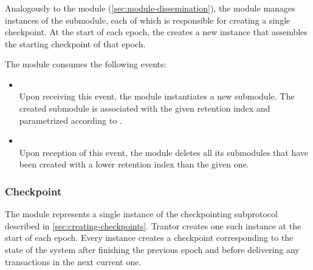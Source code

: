\documentclass{article}
\begin{document}
\subsubsection{}

Analogously to the  module (\cref{sec:module-dissemination}),
the  module manages instances of the  submodule,
each of which is responsible for creating a single checkpoint.
At the start of each epoch, the  creates a new  instance that assembles the starting checkpoint of that epoch.

The  module consumes the following events:

\begin{itemize}

    \item {}\\
    Upon receiving this event, the  module instantiates a new  submodule.
    The created submodule is associated with the given retention index and parametrized according to .

    \item {}\\
    Upon reception of this event,
    the  module deletes all its submodules that have been created with a lower retention index than the given one.

\end{itemize}

\subsubsection{Checkpoint}

The  module represents a single instance of the checkpointing subprotocol described in \cref{sec:creating-checkpoints}.
Trantor creates one such instance at the start of each epoch.
Every instance creates a checkpoint corresponding to the state of the system after finishing the previous epoch
and before delivering any transactions in the next current one.

\subsubsection{}
\subsubsection{}
\end{document}
